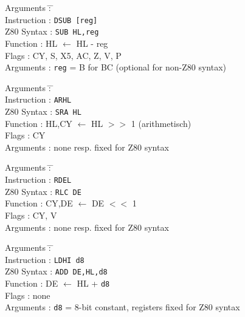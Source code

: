\documentclass[12pt,twoside]{report}
\newcommand{\tty}[1]{{\tt #1}}
\begin{document}
\begin{tabbing}
Arguments         \= : \= \kill \\
Instruction       \> : \> \tty{DSUB [reg]} \\
Z80 Syntax        \> : \> \tty{SUB HL,reg} \\
Function          \> : \> HL $\leftarrow$ HL - reg \\
Flags             \> : \> CY, S, X5, AC, Z, V, P \\
Arguments         \> : \> \tty{reg} = B for BC (optional for non-Z80 syntax) \\
\end{tabbing}

\begin{tabbing}
Arguments         \= : \= \kill \\
Instruction       \> : \> \tty{ARHL} \\
Z80 Syntax        \> : \> \tty{SRA HL} \\
Function          \> : \> HL,CY $\leftarrow$ HL $>>$ 1 (arithmetisch) \\
Flags             \> : \> CY \\
Arguments         \> : \> none resp. fixed for Z80 syntax \\
\end{tabbing}

\begin{tabbing}
Arguments         \= : \= \kill \\
Instruction       \> : \> \tty{RDEL} \\
Z80 Syntax        \> : \> \tty{RLC DE} \\
Function          \> : \> CY,DE $\leftarrow$ DE $<<$ 1 \\
Flags             \> : \> CY, V \\
Arguments         \> : \> none resp. fixed for Z80 syntax \\
\end{tabbing}

\begin{tabbing}
Arguments         \= : \= \kill \\
Instruction       \> : \> \tty{LDHI d8} \\
Z80 Syntax        \> : \> \tty{ADD DE,HL,d8} \\
Function          \> : \> DE $\leftarrow$ HL + {\tt d8} \\
Flags             \> : \> none \\
Arguments         \> : \> {\tt d8} = 8-bit constant, registers fixed for Z80 syntax \\
\end{tabbing}
\end{document}
